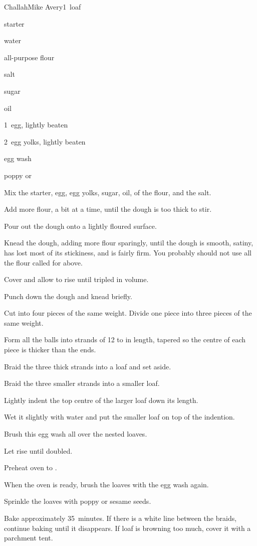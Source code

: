 \begin{recipe}{Challah\FIXME}{Mike Avery}{1~loaf}

\begin{ingredients}
\item {} starter
\item \C{\half} water
\item \C{3\twothird} all-purpose flour
\item {} salt
\item \C{\quarter} sugar
\item \C{\quarter} oil
\item 1~egg, lightly beaten
\item 2~egg yolks, lightly beaten
\item egg wash
\item poppy or 
\end{ingredients}

\begin{directions}
\item Mix the starter, egg, egg yolks, sugar, oil, \half{} of the flour, and the salt.
\item Add more flour, a bit at a time, until the dough is too thick to stir.
\item Pour out the dough onto a lightly floured surface.
\item Knead the dough, adding more flour sparingly, until the dough is smooth, satiny, has lost most of its stickiness, and is fairly firm. You probably should not use all the flour called for above.
\item Cover and allow to rise until tripled in volume.
\item Punch down the dough and knead briefly.
\item Cut into four pieces of the same weight. Divide one piece into three pieces of the same weight.
\item Form all the balls into strands of 12 to  in length, tapered so the centre of each piece is thicker than the ends.
\item Braid the three thick strands into a loaf and set aside.
\item Braid the three smaller strands into a smaller loaf.
\item Lightly indent the top centre of the larger loaf down its length.
\item Wet it slightly with water and put the smaller loaf on top of the indention.
\item Brush this egg wash all over the nested loaves.
\item Let rise until doubled.
\item Preheat oven to .
\item When the oven is ready, brush the loaves with the egg wash again.
\item Sprinkle the loaves with poppy or sesame seeds.
\item Bake approximately 35~minutes. If there is a white line between the braids, continue baking until it disappears. If loaf is browning too much, cover it with a parchment tent.
\end{directions}

\end{recipe}
